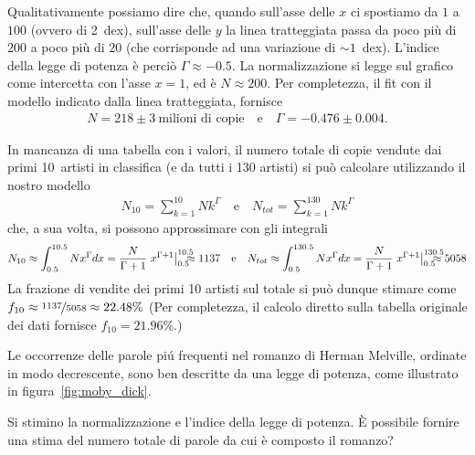 \begin{solution}

\begin{center}
    
\end{center}

Qualitativamente possiamo dire che, quando sull'asse delle $x$ ci spostiamo da
$1$ a $100$ (ovvero di 2~dex), sull'asse delle $y$ la linea tratteggiata passa
da poco più di $200$ a poco più di $20$ (che corrisponde ad una variazione
di $\sim 1$~dex). L'indice della legge di potenza è perciò $\Gamma \approx -0.5$.
La normalizzazione si legge sul grafico come intercetta con l'asse $x = 1$,
ed è $N \approx 200$. Per completezza, il fit con il modello indicato dalla
linea tratteggiata, fornisce
\begin{align*}
  N = 218 \pm 3~\text{milioni di copie} \quad \text{e} \quad \Gamma = -0.476 \pm 0.004.
\end{align*}

In mancanza di una tabella con i valori, il numero totale di copie vendute dai
primi 10~artisti in classifica (e da tutti i 130 artisti) si può calcolare
utilizzando il nostro modello
\begin{align*}
  N_{10} = \sum_{k=1}^{10} N k^\Gamma \quad \text{e} \quad N_{tot} = \sum_{k=1}^{130} N k^\Gamma
\end{align*}
che, a sua volta, si possono approssimare con gli integrali
\begin{align*}
  N_{10} \approx \int_{0.5}^{10.5} N x^\Gamma dx =
  \frac{N}{\Gamma + 1} \eval{x^{\Gamma + 1}}{0.5}{10.5} \;\; \approx 1137
  \quad \text{e} \quad
  N_{tot} \approx \int_{0.5}^{130.5} N x^\Gamma dx =
  \frac{N}{\Gamma + 1} \eval{x^{\Gamma + 1}}{0.5}{130.5} \;\; \approx 5058
\end{align*}
La frazione di vendite dei primi 10 artisti sul totale si può dunque stimare
come $f_{10} \approx \nicefrac{1137}{5058} \approx 22.48\%$
(Per completezza, il calcolo diretto sulla tabella originale dei dati fornisce
$f_{10} = 21.96\%$.)

\end{solution}



\begin{exercise}

Le occorrenze delle parole pi\'u frequenti nel romanzo  di
Herman Melville, ordinate in modo decrescente, sono ben descritte da una legge di
potenza, come illustrato in figura~\ref{fig:moby_dick}.


Si stimino la normalizzazione e l'indice della legge di potenza. \`E possibile
fornire una stima del numero totale di parole da cui è composto il romanzo?

\end{exercise}



